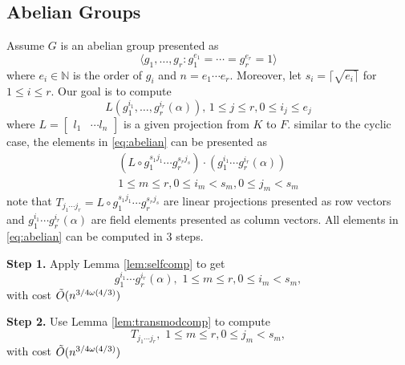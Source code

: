 

\subsection{Abelian Groups}\label{ssec:proj_abelian}

Assume $G$ is an abelian group presented as 
$$ \langle g_1, \ldots , g_r: g_{1}^{e_1} = \cdots = g_{r}^{e_r} = 1 \rangle$$
 where $ e_i \in \mathbb{N}$
is the order of $g_i$ and $n = e_1 \cdots e_r$. Moreover, let $s_i = \lceil	\sqrt{e_i \rceil}$ for $ 1\leq i \leq r$.
Our goal is to compute 
\begin{equation}\label{eq:abelian}
L (g_1^{i_1},  \ldots, g_r^{i_r}(\alpha)), \, 1 \leq j \leq r, 0 \leq i_j \leq e_j
\end{equation}
 where $L = \begin{bmatrix} l_1 & \cdots l_n \end{bmatrix}$ is a given projection from $K$ to $F$. 
similar to the cyclic case, the elements in \eqref{eq:abelian} can be presented as 
\begin{equation}
\begin{split}
(L \circ g_1^{s_1j_1} \cdots g_r^{s_rj_s})\cdot (g_1^{i_1} \cdots g_r^{i_r}(\alpha))\\ 1\leq m \leq r, 0\leq i_m < s_m, 0 \leq j_m < s_m
\end{split}
\end{equation}
note that $T_{j_1\cdots j_r} = L \circ g_1^{s_1j_1} \cdots g_r^{s_rj_s}$ are linear projections 
presented as row vectors and $g_1^{i_1} \cdots g_r^{i_r}(\alpha)$ are field elements presented as column vectors. All elements in \eqref{eq:abelian} can be computed in 3 steps.

\textbf{Step 1.} Apply Lemma \ref{lem:selfcomp} to get 
$$g_1^{i_1} \cdots g_r^{i_r}(\alpha), \,\, 1\leq m \leq r, 0\leq i_m < s_m,$$
with cost $\tilde{O}(n^{3/4 \omega(4/3)})$

\textbf{Step 2.} Use Lemma \ref{lem:transmodcomp} to compute 
$$T_{j_1\cdots j_r}, \,\, 1\leq m \leq r, 0 \leq j_m < s_m,$$
with cost $\tilde{O}(n^{3/4 \omega(4/3)})$


